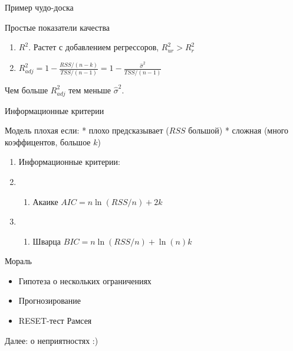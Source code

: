 \documentclass[ignorenonframetext,]{beamer}
\begin{document}
\begin{frame}{Пример чудо-доска}

\end{frame}

\begin{frame}{Простые показатели качества}

\begin{enumerate}
\def\labelenumi{\arabic{enumi}.}
\item
  $R^2$. Растет с добавлением регрессоров, $R^2_{ur}>R^2_r$
\item
  $R^2_{adj}=1-\frac{RSS/(n-k)}{TSS/(n-1)}=1-\frac{\hat{\sigma}^2}{TSS/(n-1)}$
\end{enumerate}

Чем больше $R^2_{adj}$ тем меньше $\hat{\sigma}^2$.

\end{frame}

\begin{frame}{Информационные критерии}

Модель плохая если: * плохо предсказывает ($RSS$ большой) * сложная
(много коэффицентов, большое $k$)

\begin{enumerate}
\def\labelenumi{\arabic{enumi}.}
\setcounter{enumi}{2}
\item
  Информационные критерии:
\item
  \begin{enumerate}
  \def\labelenumii{\arabic{enumii}.}
  \itemsep1pt\parskip0pt
  \item
    Акаике $AIC=n \ln (RSS/n) + 2k$
  \end{enumerate}
\item
  \begin{enumerate}
  \def\labelenumii{\arabic{enumii}.}
  \setcounter{enumii}{1}
  \itemsep1pt\parskip0pt
  \item
    Шварца $BIC=n \ln (RSS/n) + \ln(n) k $
  \end{enumerate}
\end{enumerate}

\end{frame}

\begin{frame}{Мораль}

\begin{itemize}
\item
  Гипотеза о нескольких ограничениях
\item
  Прогнозирование
\item
  RESET-тест Рамсея
\end{itemize}

Далее: о неприятностях :)

\end{frame}
\end{document}
